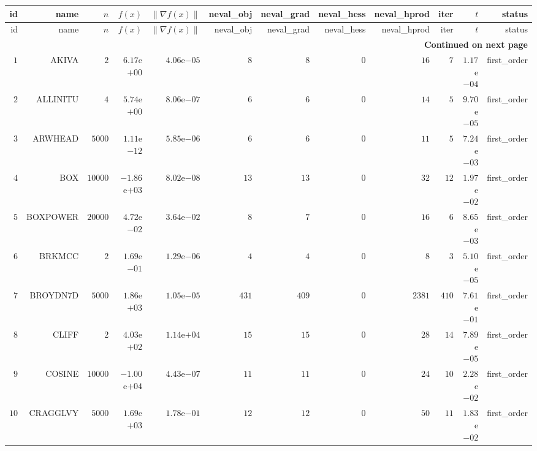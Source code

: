 \begin{longtable}{rrrrrrrrrrrr}
  \hline
  id & name & \(n\) & \(f(x)\) & \(\|\nabla f(x)\|\) & neval\_obj & neval\_grad & neval\_hess & neval\_hprod & iter & \(t\) & status \\\hline
  \endfirsthead
  \hline
  id & name & \(n\) & \(f(x)\) & \(\|\nabla f(x)\|\) & neval\_obj & neval\_grad & neval\_hess & neval\_hprod & iter & \(t\) & status \\\hline
  \endhead
  \hline
  \multicolumn{12}{r}{{\bfseries Continued on next page}}\\
  \hline
  \endfoot
  \endlastfoot
  \(     1\) & AKIVA & \(     2\) & \( 6.17\)e\(+00\) & \( 4.06\)e\(-05\) & \(     8\) & \(     8\) & \(     0\) & \(    16\) & \(     7\) & \( 1.17\)e\(-04\) & first\_order \\
  \(     2\) & ALLINITU & \(     4\) & \( 5.74\)e\(+00\) & \( 8.06\)e\(-07\) & \(     6\) & \(     6\) & \(     0\) & \(    14\) & \(     5\) & \( 9.70\)e\(-05\) & first\_order \\
  \(     3\) & ARWHEAD & \(  5000\) & \( 1.11\)e\(-12\) & \( 5.85\)e\(-06\) & \(     6\) & \(     6\) & \(     0\) & \(    11\) & \(     5\) & \( 7.24\)e\(-03\) & first\_order \\
  \(     4\) & BOX & \( 10000\) & \(-1.86\)e\(+03\) & \( 8.02\)e\(-08\) & \(    13\) & \(    13\) & \(     0\) & \(    32\) & \(    12\) & \( 1.97\)e\(-02\) & first\_order \\
  \(     5\) & BOXPOWER & \( 20000\) & \( 4.72\)e\(-02\) & \( 3.64\)e\(-02\) & \(     8\) & \(     7\) & \(     0\) & \(    16\) & \(     6\) & \( 8.65\)e\(-03\) & first\_order \\
  \(     6\) & BRKMCC & \(     2\) & \( 1.69\)e\(-01\) & \( 1.29\)e\(-06\) & \(     4\) & \(     4\) & \(     0\) & \(     8\) & \(     3\) & \( 5.10\)e\(-05\) & first\_order \\
  \(     7\) & BROYDN7D & \(  5000\) & \( 1.86\)e\(+03\) & \( 1.05\)e\(-05\) & \(   431\) & \(   409\) & \(     0\) & \(  2381\) & \(   410\) & \( 7.61\)e\(-01\) & first\_order \\
  \(     8\) & CLIFF & \(     2\) & \( 4.03\)e\(+02\) & \( 1.14\)e\(+04\) & \(    15\) & \(    15\) & \(     0\) & \(    28\) & \(    14\) & \( 7.89\)e\(-05\) & first\_order \\
  \(     9\) & COSINE & \( 10000\) & \(-1.00\)e\(+04\) & \( 4.43\)e\(-07\) & \(    11\) & \(    11\) & \(     0\) & \(    24\) & \(    10\) & \( 2.28\)e\(-02\) & first\_order \\
  \(    10\) & CRAGGLVY & \(  5000\) & \( 1.69\)e\(+03\) & \( 1.78\)e\(-01\) & \(    12\) & \(    12\) & \(     0\) & \(    50\) & \(    11\) & \( 1.83\)e\(-02\) & first\_order \\

\end{longtable}
